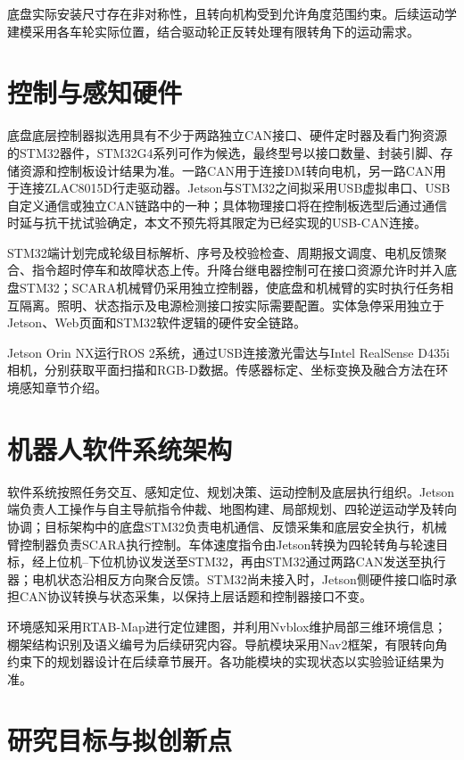 \documentclass[UTF8,12pt,a4paper,openany]{ctexbook}
\begin{document}
底盘实际安装尺寸存在非对称性，且转向机构受到允许角度范围约束。后续运动学建模采用各车轮实际位置，结合驱动轮正反转处理有限转角下的运动需求。

\section{控制与感知硬件}

底盘底层控制器拟选用具有不少于两路独立CAN接口、硬件定时器及看门狗资源的STM32器件，STM32G4系列可作为候选，最终型号以接口数量、封装引脚、存储资源和控制板设计结果为准。一路CAN用于连接DM转向电机，另一路CAN用于连接ZLAC8015D行走驱动器。Jetson与STM32之间拟采用USB虚拟串口、USB自定义通信或独立CAN链路中的一种；具体物理接口将在控制板选型后通过通信时延与抗干扰试验确定，本文不预先将其限定为已经实现的USB-CAN连接。

STM32端计划完成轮级目标解析、序号及校验检查、周期报文调度、电机反馈聚合、指令超时停车和故障状态上传。升降台继电器控制可在接口资源允许时并入底盘STM32；SCARA机械臂仍采用独立控制器，使底盘和机械臂的实时执行任务相互隔离。照明、状态指示及电源检测接口按实际需要配置。实体急停采用独立于Jetson、Web页面和STM32软件逻辑的硬件安全链路。

Jetson Orin NX运行ROS 2系统，通过USB连接激光雷达与Intel RealSense D435i相机，分别获取平面扫描和RGB-D数据。传感器标定、坐标变换及融合方法在环境感知章节介绍。

\section{机器人软件系统架构}

软件系统按照任务交互、感知定位、规划决策、运动控制及底层执行组织。Jetson端负责人工操作与自主导航指令仲裁、地图构建、局部规划、四轮逆运动学及转向协调；目标架构中的底盘STM32负责电机通信、反馈采集和底层安全执行，机械臂控制器负责SCARA执行控制。车体速度指令由Jetson转换为四轮转角与轮速目标，经上位机--下位机协议发送至STM32，再由STM32通过两路CAN发送至执行器；电机状态沿相反方向聚合反馈。STM32尚未接入时，Jetson侧硬件接口临时承担CAN协议转换与状态采集，以保持上层话题和控制器接口不变。

环境感知采用RTAB-Map进行定位建图，并利用Nvblox维护局部三维环境信息；棚架结构识别及语义编号为后续研究内容。导航模块采用Nav2框架，有限转向角约束下的规划器设计在后续章节展开。各功能模块的实现状态以实验验证结果为准。


\section{研究目标与拟创新点}
\end{document}
